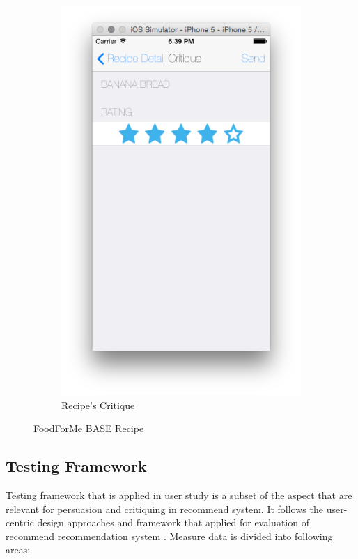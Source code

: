 \begin{figure}[h]
\begin{subfigure}{.32\textwidth}
	  		\includegraphics[width=.9\linewidth]{figures/ch4_app_screen_shots/test_system/crtiquing_evaluation_sysetm}
	  		\caption{Recipe's Critique}
	  	\end{subfigure}
	  	\caption{FoodForMe BASE Recipe}
	  	\label{fig:foodforme_base_recpie}
	  \end{figure}
\newpage
\subsection{Testing Framework}
Testing framework that is applied in user study is a subset of the aspect that are relevant for persuasion and critiquing in recommend system. It follows the user-centric design approaches \cite{pu2006trust} and framework that applied for evaluation of recommend recommendation system \cite{shani2011evaluating}. Measure data is divided into following areas:

